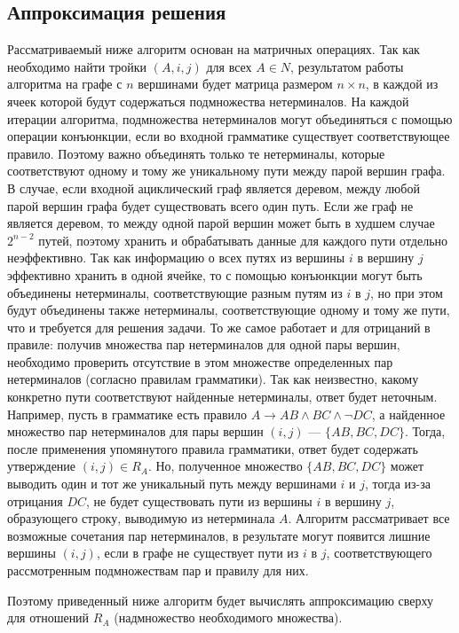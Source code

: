 \documentclass{spbau-diploma}
\begin{document}
\subsection{Аппроксимация решения}
Рассматриваемый ниже алгоритм основан на матричных операциях. Так как необходимо найти тройки $(A, i, j)$ для всех $A \in N$, результатом работы алгоритма  на графе с $n$ вершинами будет матрица размером $n \times n$, в каждой из ячеек которой будут содержаться подмножества нетерминалов. На каждой итерации алгоритма, подмножества нетерминалов могут объединяться с помощью операции конъюнкции, если во входной грамматике существует соответствующее правило. Поэтому важно объединять только те нетерминалы, которые соответствуют одному и тому же уникальному пути между парой вершин графа. В случае, если входной ациклический граф является деревом, между любой парой вершин графа будет существовать всего один путь. Если же граф не является деревом, то между одной парой вершин может быть в худшем случае $2^{n-2}$ путей, поэтому хранить и обрабатывать данные для каждого пути отдельно неэффективно. Так как информацию о всех путях из вершины $i$ в вершину $j$ эффективно хранить в одной ячейке, то с помощью конъюнкции могут быть объединены нетерминалы, соответствующие разным путям из $i$ в $j$, но при этом будут объединены также нетерминалы, соответствующие одному и тому же пути, что и требуется для решения задачи. То же самое работает и для отрицаний в правиле: получив множества пар нетерминалов для одной пары вершин, необходимо проверить отсутствие в этом множестве определенных пар нетерминалов (согласно правилам грамматики). Так как неизвестно, какому конкретно пути соответствуют найденные нетерминалы, ответ будет неточным.  Например, пусть в грамматике есть правило $A \to AB \wedge BC \wedge \neg DC$, а найденное множество пар нетерминалов для пары вершин $(i, j)$ --- $\{ AB, BC, DC\}$. Тогда, после применения упомянутого правила грамматики, ответ будет содержать утверждение $(i, j) \in R_A$. Но, полученное множество $\{ AB, BC, DC\}$ может выводить один и тот же уникальный путь между вершинами $i$ и $j$, тогда из-за отрицания $DC$, не будет существовать пути из вершины $i$ в вершину $j$, образующего строку, выводимую из нетерминала $A$.  Алгоритм рассматривает все возможные сочетания пар нетерминалов, в результате могут появится лишние вершины $(i,j)$, если в графе не существует пути из $i$ в $j$, соответствующего рассмотренным подмножествам пар и правилу для них. 

Поэтому приведенный ниже алгоритм будет вычислять аппроксимацию сверху для отношений $R_A$ (надмножество необходимого множества).
\end{document}
